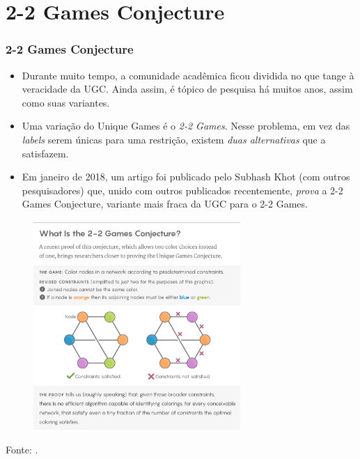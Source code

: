 \documentclass[11pt, handout]{beamer}
\begin{document}


\section{2-2 Games Conjecture}
\begin{frame}[<+->]
    \frametitle{2-2 Games Conjecture}
    \begin{itemize}
        \item Durante muito tempo, a comunidade acadêmica ficou dividida no que tange à veracidade da UGC. Ainda assim, é tópico de pesquisa há muitos anos, assim como suas variantes.
        \item Uma variação do Unique Games é o \emph{2-2 Games}. Nesse problema, em vez das \textit{labels} serem únicas para uma restrição, existem \emph{duas alternativas} que a satisfazem.
        \item Em janeiro de 2018, um artigo foi publicado pelo Subhash Khot (com outros pesquisadores) que, unido com outros publicados recentemente, \emph{prova} a 2-2 Games Conjecture, variante mais fraca da UGC para o 2-2 Games.
    \end{itemize}
\end{frame}

\begin{frame}
    \begin{figure}
        \centering
        \includegraphics[width=0.7\textwidth]{images/2-2Games.jpg}
    \end{figure}{}
    
    Fonte: \cite{history}.
\end{frame}
\end{document}
